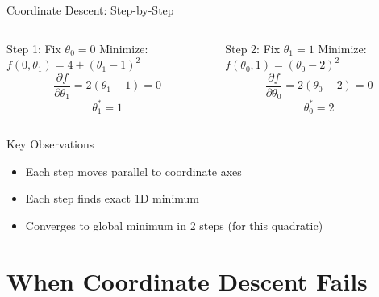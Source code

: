 \documentclass{beamer}
\begin{document}
\begin{frame}{Coordinate Descent: Step-by-Step}
\begin{columns}
\begin{column}{0.5\textwidth}
\begin{codebox}{Step 1: Fix $\theta_0 = 0$}
Minimize: $f(0, \theta_1) = 4 + (\theta_1 - 1)^2$
$$\frac{\partial f}{\partial \theta_1} = 2(\theta_1 - 1) = 0$$
$$\theta_1^* = 1$$
\end{codebox}
\end{column}

\begin{column}{0.5\textwidth}
\begin{codebox}{Step 2: Fix $\theta_1 = 1$}  
Minimize: $f(\theta_0, 1) = (\theta_0 - 2)^2$
$$\frac{\partial f}{\partial \theta_0} = 2(\theta_0 - 2) = 0$$
$$\theta_0^* = 2$$
\end{codebox}
\end{column}
\end{columns}

\begin{keypointsbox}{Key Observations}
\begin{itemize}
\item Each step moves parallel to coordinate axes
\item Each step finds exact 1D minimum
\item Converges to global minimum in 2 steps (for this quadratic)
\end{itemize}
\end{keypointsbox}
\end{frame}

\section{When Coordinate Descent Fails}
\end{document}
